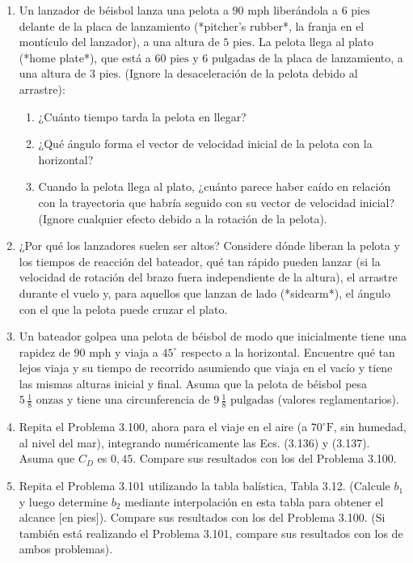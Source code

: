 \documentclass[12pt]{book}
\begin{document}
\begin{enumerate}
\item[3.98] Un lanzador de béisbol lanza una pelota a $90\text{ mph}$ liberándola a $6\text{ pies}$ delante de la placa de lanzamiento (*pitcher's rubber*, la franja en el montículo del lanzador), a una altura de $5\text{ pies}$. La pelota llega al plato (*home plate*), que está a $60\text{ pies y } 6\text{ pulgadas}$ de la placa de lanzamiento, a una altura de $3\text{ pies}$. (Ignore la desaceleración de la pelota debido al arrastre):
\begin{enumerate}
\item[(a)] ¿Cuánto tiempo tarda la pelota en llegar?
\item[(b)] ¿Qué ángulo forma el vector de velocidad inicial de la pelota con la horizontal?
\item[(c)] Cuando la pelota llega al plato, ¿cuánto parece haber caído en relación con la trayectoria que habría seguido con su vector de velocidad inicial? (Ignore cualquier efecto debido a la rotación de la pelota).
\end{enumerate}

\item[3.99] ¿Por qué los lanzadores suelen ser altos? Considere dónde liberan la pelota y los tiempos de reacción del bateador, qué tan rápido pueden lanzar (si la velocidad de rotación del brazo fuera independiente de la altura), el arrastre durante el vuelo y, para aquellos que lanzan de lado (*sidearm*), el ángulo con el que la pelota puede cruzar el plato.

\item[3.100] Un bateador golpea una pelota de béisbol de modo que inicialmente tiene una rapidez de $90\text{ mph}$ y viaja a $45^\circ$ respecto a la horizontal. Encuentre qué tan lejos viaja y su tiempo de recorrido asumiendo que viaja en el vacío y tiene las mismas alturas inicial y final. Asuma que la pelota de béisbol pesa $5\,\frac{1}{8}\text{ onzas}$ y tiene una circunferencia de $9\,\frac{1}{8}\text{ pulgadas}$ (valores reglamentarios).

\item[3.101] Repita el Problema 3.100, ahora para el viaje en el aire (a $70^\circ\text{F}$, sin humedad, al nivel del mar), integrando numéricamente las Ecs. (3.136) y (3.137). Asuma que $C_D$ es $0{,}45$. Compare sus resultados con los del Problema 3.100.

\item[3.102] Repita el Problema 3.101 utilizando la tabla balística, Tabla 3.12. (Calcule $b_1$ y luego determine $b_2$ mediante interpolación en esta tabla para obtener el alcance [en pies]). Compare sus resultados con los del Problema 3.100. (Si también está realizando el Problema 3.101, compare sus resultados con los de ambos problemas).


\end{enumerate}
\end{document}
